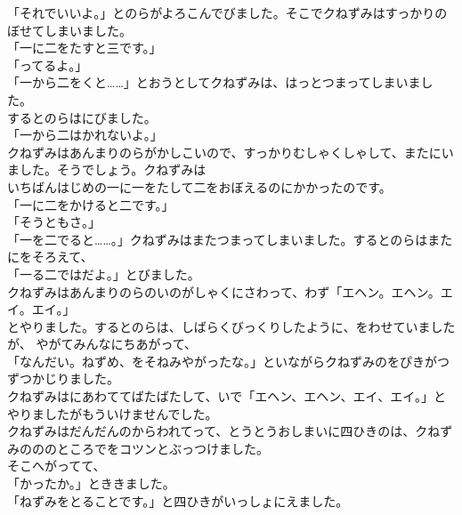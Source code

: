 \documentclass[
a4paper,
10pt,
book]
{tarticle}
\begin{document}
\newpage
\thispagestyle{fancy}
\fancyhead[R]{\empty}
「それでいいよ。」とのらがよろこんでびました。そこでクねずみはすっかりのぼせてしまいました。\\
「一に二をたすと三です。」\\
「ってるよ。」\\
「一から二をくと……」とおうとしてクねずみは、はっとつまってしまいました。\\
\indent するとのらはにびました。\\
「一から二はかれないよ。」\\
\indent クねずみはあんまりのらがかしこいので、すっかりむしゃくしゃして、またにいました。そうでしょう。クねずみは\\
いちばんはじめの一に一をたして二をおぼえるのにかかったのです。\\
「一に二をかけると二です。」\\
「そうともさ。」\\
「一を二でると……。」クねずみはまたつまってしまいました。するとのらはまたにをそろえて、\\
「一る二ではだよ。」とびました。\\
\indent クねずみはあんまりのらのいのがしゃくにさわって、わず「エヘン。エヘン。エイ。エイ。」\\
とやりました。するとのらは、しばらくびっくりしたように、をわせていましたが、
\newpage
\thispagestyle{fancy}
\fancyhead[R]{\empty}
やがてみんなにちあがって、\\
「なんだい。ねずめ、をそねみやがったな。」といながらクねずみのをぴきがつずつかじりました。\\
\indent クねずみはにあわててばたばたして、いで「エヘン、エヘン、エイ、エイ。」とやりましたがもういけませんでした。\\
\indent クねずみはだんだんのからわれてって、とうとうおしまいに四ひきのは、クねずみのののところでをコツンとぶっつけました。\\
\indent そこへがってて、\\
「かったか。」とききました。\\
「ねずみをとることです。」と四ひきがいっしょにえました。
\end{document}
